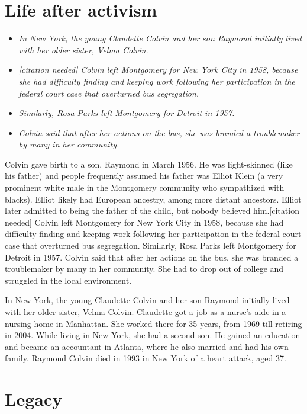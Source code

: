 \section{Life after activism}\label{life-after-activism}

\begin{itemize}
\item
  \emph{In New York, the young Claudette Colvin and her son Raymond
  initially lived with her older sister, Velma Colvin.}
\item
  \emph{{[}citation needed{]} Colvin left Montgomery for New York City
  in 1958, because she had difficulty finding and keeping work following
  her participation in the federal court case that overturned bus
  segregation.}
\item
  \emph{Similarly, Rosa Parks left Montgomery for Detroit in 1957.}
\item
  \emph{Colvin said that after her actions on the bus, she was branded a
  troublemaker by many in her community.}
\end{itemize}

Colvin gave birth to a son, Raymond in March 1956. He was light-skinned
(like his father) and people frequently assumed his father was Elliot
Klein (a very prominent white male in the Montgomery community who
sympathized with blacks). Elliot likely had European ancestry, among
more distant ancestors. Elliot later admitted to being the father of the
child, but nobody believed him.{[}citation needed{]} Colvin left
Montgomery for New York City in 1958, because she had difficulty finding
and keeping work following her participation in the federal court case
that overturned bus segregation. Similarly, Rosa Parks left Montgomery
for Detroit in 1957. Colvin said that after her actions on the bus, she
was branded a troublemaker by many in her community. She had to drop out
of college and struggled in the local environment.

In New York, the young Claudette Colvin and her son Raymond initially
lived with her older sister, Velma Colvin. Claudette got a job as a
nurse's aide in a nursing home in Manhattan. She worked there for 35
years, from 1969 till retiring in 2004. While living in New York, she
had a second son. He gained an education and became an accountant in
Atlanta, where he also married and had his own family. Raymond Colvin
died in 1993 in New York of a heart attack, aged 37.

\section{Legacy}\label{legacy}

